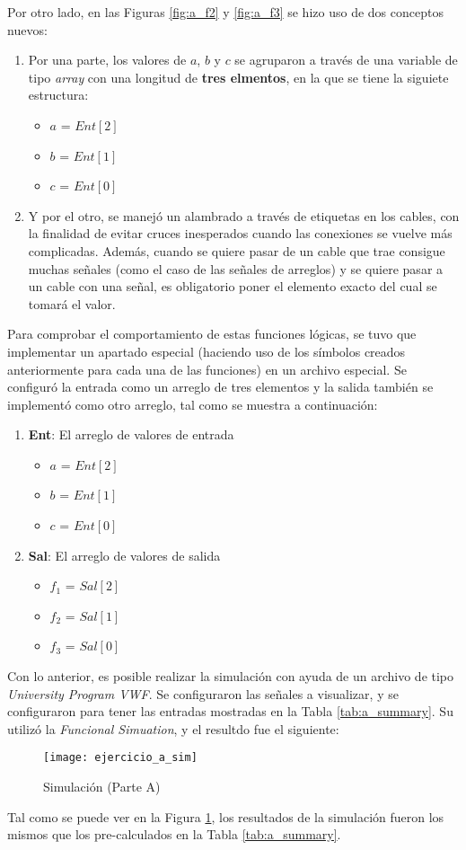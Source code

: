 \documentclass[../procedimientos.tex]{subfiles}
\begin{document}
Por otro lado, en las Figuras \ref{fig:a_f2} y \ref{fig:a_f3} se hizo uso de 
dos conceptos nuevos:
\begin{enumerate}
  \item Por una parte, los valores de $a$, $b$ y $c$ se agruparon a través 
    de una variable de tipo \textit{array} con una longitud de \textbf{tres 
    elmentos}, en la que se tiene la siguiete estructura:
    \begin{itemize}
      \item $a$ = $Ent[2]$
      \item $b$ = $Ent[1]$
      \item $c$ = $Ent[0]$
    \end{itemize}
  \item Y por el otro, se manejó un alambrado a través de etiquetas en los 
    cables, con la finalidad de evitar cruces inesperados cuando las 
    conexiones se vuelve más complicadas. Además, cuando se quiere pasar de un 
    cable que trae consigue muchas señales (como el caso de las señales de 
    arreglos) y se quiere pasar a un cable con una señal, es obligatorio poner 
    el elemento exacto del cual se tomará el valor.
\end{enumerate}

Para comprobar el comportamiento de estas funciones lógicas, se tuvo que 
implementar un apartado especial (haciendo uso de los símbolos creados 
anteriormente para cada una de las funciones) en un archivo especial. Se 
configuró la entrada como un arreglo de tres elementos y la salida también se 
implementó como otro arreglo, tal como se muestra a continuación:
\begin{enumerate}
  \item \textbf{Ent}: El arreglo de valores de entrada
    \begin{itemize}
      \item $a$ = $Ent[2]$
      \item $b$ = $Ent[1]$
      \item $c$ = $Ent[0]$
    \end{itemize}
  \item \textbf{Sal}: El arreglo de valores de salida
    \begin{itemize}
      \item $f_1$ = $Sal[2]$
      \item $f_2$ = $Sal[1]$
      \item $f_3$ = $Sal[0]$
    \end{itemize}
\end{enumerate}

Con lo anterior, es posible realizar la simulación con ayuda de un archivo de 
tipo \textit{University Program VWF}. Se configuraron las señales a 
visualizar, y se configuraron para tener las entradas mostradas en la Tabla 
\ref{tab:a_summary}. Su utilizó la \textit{Funcional Simuation}, y el resultdo 
fue el siguiente:
\begin{figure}[H]
  \texttt{[image: ejercicio\_a\_sim]}
  \caption{Simulación (Parte A)}
  \label{fig:a_sim}
\end{figure}

Tal como se puede ver en la Figura \ref{fig:a_sim}, los resultados de la 
simulación fueron los mismos que los pre-calculados en la Tabla 
\ref{tab:a_summary}.
\end{document}
